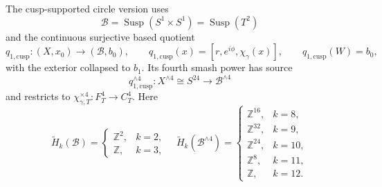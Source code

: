 \begin{enumerate}[leftmargin=1.8em,itemsep=.65em]
The cusp-supported circle version uses
\[
 \mathcal B=\operatorname{Susp}(S^1\times S^1)=\operatorname{Susp}(T^2)
\]
and the continuous surjective based quotient
\[
 q_{1,\mathrm{cusp}}:(X,x_0)\longrightarrow(\mathcal B,b_0),
 \qquad
 q_{1,\mathrm{cusp}}(x)=[r,e^{i\phi},\chi_\gamma(x)],
 \qquad q_{1,\mathrm{cusp}}(W)=b_0,
\]
with the exterior collapsed to \(b_1\).  Its fourth smash power has source
\[
 q_{1,\mathrm{cusp}}^{\wedge4}:X^{\wedge4}\cong S^{24}
 \longrightarrow\mathcal B^{\wedge4}
\]
and restricts to
\(\chi_{\gamma,T}^{\times4}:F_T^4\to C_T^4\).  Here
\[
 \widetilde H_k(\mathcal B)=
 \begin{cases}\mathbb Z^2,&k=2,\\ \mathbb Z,&k=3,\end{cases}
\quad
 \widetilde H_k(\mathcal B^{\wedge4})=
 \begin{cases}
 \mathbb Z^{16},&k=8,\\ \mathbb Z^{32},&k=9,\\
 \mathbb Z^{24},&k=10,\\ \mathbb Z^8,&k=11,\\ \mathbb Z,&k=12.
 \end{cases}
\]


\end{enumerate}
